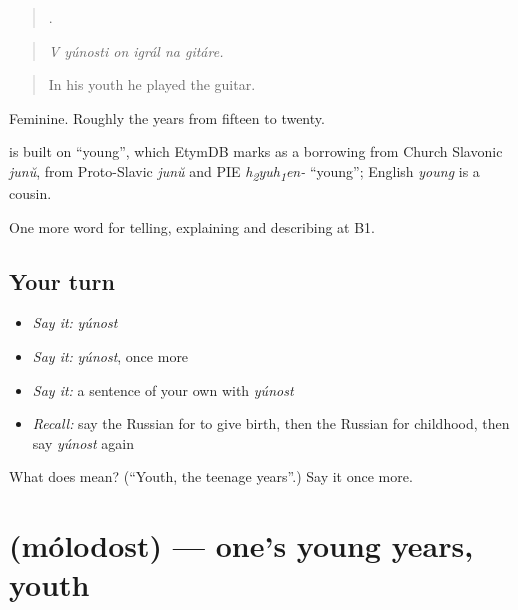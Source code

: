 \begin{quote}
     .
\end{quote}

\begin{quote}
\emph{V yúnosti on igrál na gitáre.}
\end{quote}

\begin{quote}
In his youth he played the guitar.
\end{quote}

Feminine. Roughly the years from fifteen to twenty.

\begin{cousinweb}
\emph{} is built on \emph{} \textquotedblleft{}young\textquotedblright{}, which EtymDB marks as a borrowing from Church Slavonic \emph{junŭ}, from Proto-Slavic \emph{junŭ} and PIE \emph{h\textsubscript{2}yuh\textsubscript{1}en-} \textquotedblleft{}young\textquotedblright{}; English \emph{young} is a cousin.
\end{cousinweb}

\begin{grammarlens}[title={What you've built}]
One more word for telling, explaining and describing at B1.
\end{grammarlens}

\subsection*{Your turn}
\begin{itemize}
\raggedright
  \item \emph{Say it:} \emph{yúnost}
  \item \emph{Say it:} \emph{yúnost}, once more
  \item \emph{Say it:} a sentence of your own with \emph{yúnost}
  \item \emph{Recall:} say the Russian for to give birth, then the Russian for childhood, then say \emph{yúnost} again
\end{itemize}

\begin{tcolorbox}[breakable,colback=teal!4,colframe=teal!35!black,title={Before you move on}]
What does  mean? (\textquotedblleft{}Youth, the teenage years\textquotedblright{}.) Say it once more.
\end{tcolorbox}
\section[\texorpdfstring{\ru{молодость} (mólodost)}{молодость (mólodost)}]{ (mólodost) — one's young years, youth}

